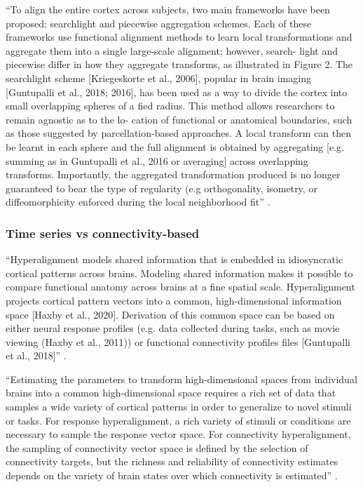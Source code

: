``To align the entire cortex across subjects, two main frameworks have been
proposed: searchlight and piecewise aggregation schemes. Each of these
frameworks use functional alignment methods to learn local transformations and
aggregate them into a single large-scale alignment; however, search- light and
piecewise differ in how they aggregate transforms, as illustrated in Figure 2.
The searchlight scheme [Kriegeskorte et al., 2006], popular in brain imaging
[Guntupalli et al., 2018; 2016], has been used as a way to divide the cortex
into small overlapping spheres of a fied radius. This method allows researchers
to remain agnostic as to the lo- cation of functional or anatomical boundaries,
such as those suggested by parcellation-based approaches. A local transform can
then be learnt in each sphere and the full alignment is obtained by aggregating
[e.g. summing as in Guntupalli et al., 2016 or averaging] across overlapping
transforms. Importantly, the aggregated transformation produced is no longer
guaranteed to bear the type of regularity (e.g orthogonality, isometry, or
diffeomorphicity enforced during the local neighborhood fit''
\citep{bazeille2021empirical}.


\subsubsection{Time series vs connectivity-based}


%
``Hyperalignment models shared information that is embedded in idiosyncratic
cortical patterns across brains. Modeling shared information makes it possible
to compare functional anatomy across brains at a fine spatial scale.
Hyperalignment projects cortical pattern vectors into a common, high-dimensional
information space [Haxby et al., 2020]. Derivation of this common space can be
based on either neural response profiles (e.g. data collected during tasks, such
as movie viewing (Haxby et al., 2011)) or functional connectivity profiles files
[Guntupalli et al., 2018]'' \citep{busch2021hybrid}.

``Estimating the parameters to transform high-dimensional spaces from individual
brains into a common high-dimensional space requires a rich set of data that
samples a wide variety of cortical patterns in order to generalize to novel
stimuli or tasks. For response hyperalignment, a rich variety of stimuli or
conditions are necessary to sample the response vector space. For connectivity
hyperalignment, the sampling of connectivity vector space is defined by the
selection of connectivity targets, but the richness and reliability of
connectivity estimates depends on the variety of brain states over which
connectivity is estimated'' \citep{haxby2020hyperalignment}.

